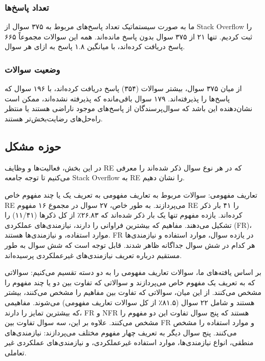 \documentclass[a4paper,10pt]{article}
\begin{document}
            \subsubsection{تعداد پاسخ‌ها}

                ما به صورت سیستماتیک تعداد پاسخ‌های مربوط به ۳۷۵ سوال از Stack Overflow را ثبت کردیم. تنها ۲۱ از ۳۷۵ سوال بدون پاسخ مانده‌اند. همه این سوالات مجموعاً ۶۶۵ پاسخ دریافت کرده‌اند، با میانگین ۱.۸ پاسخ به ازای هر سوال.

            \subsubsection{وضعیت سوالات}

                از میان ۳۷۵ سوال، بیشتر سوالات (۳۵۴) پاسخ دریافت کرده‌اند، با ۱۹۶ سوال که پاسخ‌ها را پذیرفته‌اند. ۱۷۹ سوال باقی‌مانده که پذیرفته نشده‌اند، ممکن است نشان‌دهنده این باشد که سوال‌پرسندگان از پاسخ‌های موجود ناراضی هستند یا منتظر راه‌حل‌های رضایت‌بخش‌تر هستند.

        \subsection{حوزه مشکل}

            در این بخش، فعالیت‌ها و وظایف RE که در هر نوع سوال ذکر شده‌اند را معرفی می‌کنیم تا توجه جامعه Stack Overflow به RE را نشان دهیم.

            تعاریف مفهومی: سوالات مربوط به تعاریف مفهومی به تعریف یک یا چند مفهوم خاص RE می‌پردازند. به طور خاص، ۲۷ سوال در مجموع ۱۶ مفهوم RE را ۴۱ بار ذکر کرده‌اند. یازده مفهوم تنها یک بار ذکر شده‌اند که ۲۶.۸۳٪ از کل ذکرها (۱۱/۴۱) را تشکیل می‌دهند. مفاهیم که بیشترین فراوانی را دارند، نیازمندی‌های عملکردی (FR)، موارد استفاده، و نیازمندی‌ها هستند. FR در یازده سوال، موارد استفاده و نیازمندی‌ها هر کدام در شش سوال جداگانه ظاهر شدند. قابل توجه است که شش سوال به طور مستقیم درباره تعریف نیازمندی‌های غیرعملکردی پرسیده‌اند.

            بر اساس یافته‌های ما، سوالات تعاریف مفهومی را به دو دسته تقسیم می‌کنیم: سوالاتی که به تعریف یک مفهوم خاص می‌پردازند و سوالاتی که تفاوت بین دو یا چند مفهوم را مشخص می‌کنند. از این میان، سوالاتی که تفاوت بین مفاهیم را مشخص می‌کنند، بیشتر هستند و شامل ۲۲ سوال (۸۱.۵٪ از کل سوالات تعاریف مفهومی) می‌شوند. مفاهیمی که بیشترین تمایز را دارند، FR و NFR هستند که پنج سوال تفاوت این دو مفهوم را مشخص می‌کنند. علاوه بر این، سه سوال تفاوت بین FR و موارد استفاده را مشخص می‌کنند. پنج سوال دیگر به تعریف چهار مفهوم مختلف می‌پردازند: نیازمندی‌های منطقی، انواع نیازمندی‌ها، موارد استفاده غیرعملکردی، و نیازمندی‌های عملکردی غیر تعاملی.
\end{document}
